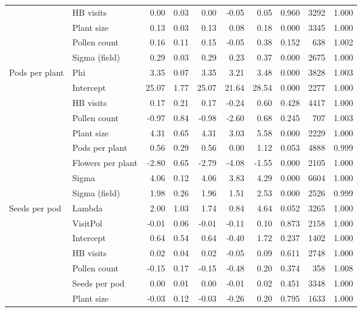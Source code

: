 \begin{table}[ht]
\begin{tabular}{l|l|r|r|r|r|r|r|r|r}
\cline{2-10}
 & HB visits & 0.00 & 0.03 & 0.00 & -0.05 & 0.05 & 0.960 & 3292 & 1.000\\
\cline{2-10}
 & Plant size & 0.13 & 0.03 & 0.13 & 0.08 & 0.18 & 0.000 & 3345 & 1.000\\
\cline{2-10}
 & Pollen count & 0.16 & 0.11 & 0.15 & -0.05 & 0.38 & 0.152 & 638 & 1.002\\
\cline{2-10}
 & Sigma (field) & 0.29 & 0.03 & 0.29 & 0.23 & 0.37 & 0.000 & 2675 & 1.000\\
\cline{2-10}
\multirow{-6}{*}{\raggedright\arraybackslash Pods per plant} & Phi & 3.35 & 0.07 & 3.35 & 3.21 & 3.48 & 0.000 & 3828 & 1.003\\
\cline{1-10}
 & Intercept & 25.07 & 1.77 & 25.07 & 21.64 & 28.54 & 0.000 & 2277 & 1.000\\
\cline{2-10}
 & HB visits & 0.17 & 0.21 & 0.17 & -0.24 & 0.60 & 0.428 & 4417 & 1.000\\
\cline{2-10}
 & Pollen count & -0.97 & 0.84 & -0.98 & -2.60 & 0.68 & 0.245 & 707 & 1.003\\
\cline{2-10}
 & Plant size & 4.31 & 0.65 & 4.31 & 3.03 & 5.58 & 0.000 & 2229 & 1.000\\
\cline{2-10}
 & Pods per plant & 0.56 & 0.29 & 0.56 & 0.00 & 1.12 & 0.053 & 4888 & 0.999\\
\cline{2-10}
 & Flowers per plant & -2.80 & 0.65 & -2.79 & -4.08 & -1.55 & 0.000 & 2105 & 1.000\\
\cline{2-10}
 & Sigma & 4.06 & 0.12 & 4.06 & 3.83 & 4.29 & 0.000 & 6604 & 1.000\\
\cline{2-10}
 & Sigma (field) & 1.98 & 0.26 & 1.96 & 1.51 & 2.53 & 0.000 & 2526 & 0.999\\
\cline{2-10}
\multirow{-9}{*}{\raggedright\arraybackslash Seeds per pod} & Lambda & 2.00 & 1.03 & 1.74 & 0.84 & 4.64 & 0.052 & 3265 & 1.000\\
\cline{1-10}
 & VisitPol & -0.01 & 0.06 & -0.01 & -0.11 & 0.10 & 0.873 & 2158 & 1.000\\
\cline{2-10}
 & Intercept & 0.64 & 0.54 & 0.64 & -0.40 & 1.72 & 0.237 & 1402 & 1.000\\
\cline{2-10}
 & HB visits & 0.02 & 0.04 & 0.02 & -0.05 & 0.09 & 0.611 & 2748 & 1.000\\
\cline{2-10}
 & Pollen count & -0.15 & 0.17 & -0.15 & -0.48 & 0.20 & 0.374 & 358 & 1.008\\
\cline{2-10}
 & Seeds per pod & 0.00 & 0.01 & 0.00 & -0.01 & 0.02 & 0.451 & 3348 & 1.000\\
\cline{2-10}
 & Plant size & -0.03 & 0.12 & -0.03 & -0.26 & 0.20 & 0.795 & 1633 & 1.000\\

\end{tabular}
\end{table}
